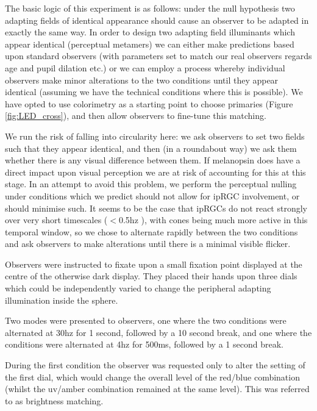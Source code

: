 The basic logic of this experiment is as follows: under the null hypothesis two adapting fields of identical appearance should cause an observer to be adapted in exactly the same way. In order to design two adapting field illuminants which appear identical (perceptual metamers) we can either make predictions based upon standard observers (with parameters set to match our real observers regards age and pupil dilation etc.) or we can employ a process whereby individual observers make minor alterations to the two conditions until they appear identical (assuming we have the technical conditions where this is possible). %
We have opted to use colorimetry as a starting point to choose primaries (Figure \ref{fig:LED_cross}), and then allow observers to fine-tune this matching.

We run the risk of falling into circularity here: we ask observers to set two fields such that they appear identical, and then (in a roundabout way) we ask them whether there is any visual difference between them. If melanopsin does have a direct impact upon visual perception we are at risk of accounting for this at this stage. In an attempt to avoid this problem, we perform the perceptual nulling under conditions which we predict should not allow for \gls{ipRGC} involvement, or should minimise such. It seems to be the case that \glspl{ipRGC} do not react strongly over very short timescales ($<$0.5hz \citep{spitschan_human_2017-1}), with cones being much more active in this temporal window, so we chose to alternate rapidly between the two conditions and ask observers to make alterations until there is a minimal visible flicker.

Observers were instructed to fixate upon a small fixation point displayed at the centre of the otherwise dark display. They placed their hands upon three dials which could be independently varied to change the peripheral adapting illumination inside the sphere.

Two modes were presented to observers, one where the two conditions were alternated at 30hz for 1 second, followed by a 10 second break, and one where the conditions were alternated at 4hz for 500ms, followed by a 1 second break. 

During the first condition the observer was requested only to alter the setting of the first dial, which would change the overall level of the red/blue combination (whilst the uv/amber combination remained at the same level). This was referred to as brightness matching.

